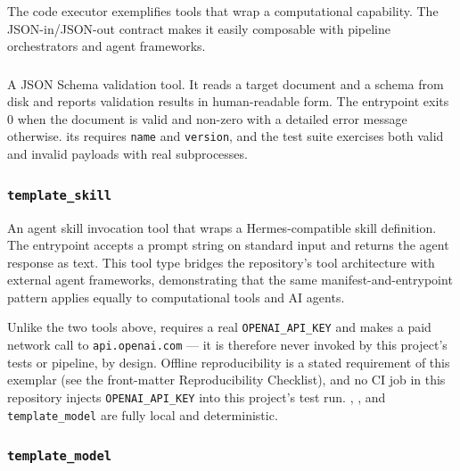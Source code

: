 \documentclass[
]{article}
\begin{document}
The code executor exemplifies tools that wrap a computational
capability. The JSON-in/JSON-out contract makes it easily composable
with pipeline orchestrators and agent frameworks.

\subsubsection{\texorpdfstring{}{template_validator}}\label{template_validator}

A JSON Schema validation tool. It reads a target document and a schema
from disk and reports validation results in human-readable form. The
entrypoint  exits 0 when the document is
valid and non-zero with a detailed error message otherwise. its
 requires \texttt{name} and
\texttt{version}, and the test suite exercises both valid and invalid
payloads with real subprocesses.

\subsubsection{\texorpdfstring{\texttt{template\_skill}}{template_skill}}\label{template_skill}

An agent skill invocation tool that wraps a Hermes-compatible skill
definition. The entrypoint  accepts a prompt
string on standard input and returns the agent response as text. This
tool type bridges the repository's tool architecture with external agent
frameworks, demonstrating that the same manifest-and-entrypoint pattern
applies equally to computational tools and AI agents.

Unlike the two tools above,  requires a real
\texttt{OPENAI\_API\_KEY} and makes a paid network call to
\texttt{api.openai.com} --- it is therefore never invoked by this
project's tests or pipeline, by design. Offline reproducibility is a
stated requirement of this exemplar (see the front-matter
Reproducibility Checklist), and no CI job in this repository injects
\texttt{OPENAI\_API\_KEY} into this project's test run.
, , and
\texttt{template\_model} are fully local and deterministic.

\subsubsection{\texorpdfstring{\texttt{template\_model}}{template_model}}\label{template_model}
\end{document}
